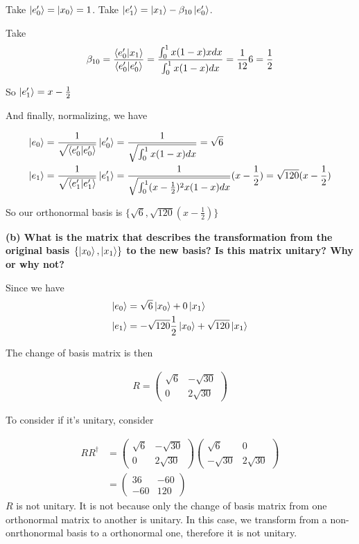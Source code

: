 \documentclass{article}
\newcommand{\Set}[1]{\{#1\}}
\begin{document}
Take $\ket{e'_0} = \ket{x_0} = 1$. Take $\ket{e'_1} = \ket{x_1} - \beta_{10} \ket{e'_0}$. 

Take 
\begin{align}
\beta_{10} = \frac{\bra{e'_0}\ket{x_1}}{\bra{e'_0}\ket{e'_0}}
= \frac{\int_0^1 x(1-x)xdx}{\int_0^1 x(1-x)dx} = \frac{1}{12}6 = \frac{1}{2}
\end{align}

So $\ket{e'_1} = x - \frac{1}{2}$

And finally, normalizing, we have

\begin{align}
    \ket{e_0} &= \frac{1}{\sqrt{\bra{e'_0}\ket{e'_0}}} \ket{e'_0} =  \frac{1}{\sqrt{\int_0^1 x(1-x)dx}} = \sqrt{6} \\
    \ket{e_1} &= \frac{1}{\sqrt{\bra{e'_1}\ket{e'_1}}} \ket{e'_1} = \frac{1}{\sqrt{\int_0^1 (x-\frac{1}{2})^2 x(1-x)dx}} (x-\frac{1}{2})= \sqrt{120} (x - \frac{1}{2})
\end{align}

So our orthonormal basis is $\Set{\sqrt{6}, \sqrt{120}(x - \frac{1}{2})}$


\textbf{(b) What is the matrix that describes the transformation from the original basis $\{\ket{x_0}, \ket{x_1}\}$ to the new basis? Is this matrix unitary? Why or why not?}

Since we have 
\begin{align}
    \ket{e_0} &= \sqrt{6} \ket{x_0} + 0 \ket{x_1} \\
    \ket{e_1} &= -\sqrt{120}\frac{1}{2} \ket{x_0} + \sqrt{120} \ket{x_1}
\end{align}

The change of basis matrix is then

\begin{align}
    R = \begin{pmatrix}
        \sqrt{6} & -\sqrt{30} \\ 0 &  2\sqrt{30}
    \end{pmatrix}
\end{align}

To consider if it's unitary, consider

\begin{align}
    RR^\dagger &= \begin{pmatrix}
        \sqrt{6} & -\sqrt{30} \\ 0 &  2\sqrt{30}
    \end{pmatrix} \begin{pmatrix}
        \sqrt{6} & 0 \\ -\sqrt{30}  &  2\sqrt{30}
    \end{pmatrix} \\
    &= \begin{pmatrix}
        36 & -60 \\ -60  & 120
    \end{pmatrix}
\end{align}
$R$ is not unitary. It is not because only the change of basis matrix from one orthonormal matrix to another is unitary. In this case, we transform from a non-onrthonormal basis to a orthonormal one, therefore it is not unitary.
\end{document}
